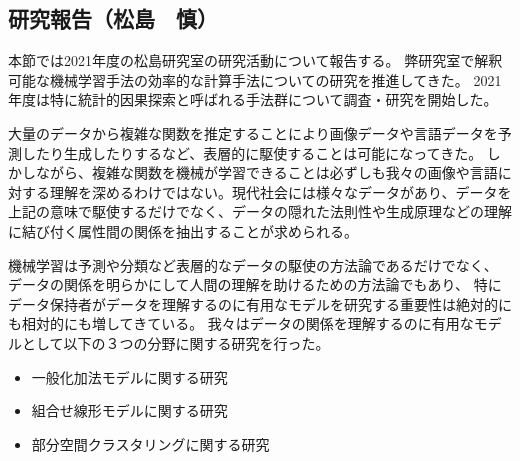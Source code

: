 \subsection{研究報告（松島　慎）}

本節では2021年度の松島研究室の研究活動について報告する。
弊研究室で解釈可能な機械学習手法の効率的な計算手法についての研究を推進してきた。
2021年度は特に統計的因果探索と呼ばれる手法群について調査・研究を開始した。


大量のデータから複雑な関数を推定することにより画像データや言語データを予測したり生成したりするなど、表層的に駆使することは可能になってきた。
しかしながら、複雑な関数を機械が学習できることは必ずしも我々の画像や言語に対する理解を深めるわけではない。現代社会には様々なデータがあり、データを上記の意味で駆使するだけでなく、データの隠れた法則性や生成原理などの理解に結び付く属性間の関係を抽出することが求められる。

機械学習は予測や分類など表層的なデータの駆使の方法論であるだけでなく、
データの関係を明らかにして人間の理解を助けるための方法論でもあり、
特にデータ保持者がデータを理解するのに有用なモデルを研究する重要性は絶対的にも相対的にも増してきている。
我々はデータの関係を理解するのに有用なモデルとして以下の３つの分野に関する研究を行った。
\begin{itemize}
    \item 一般化加法モデルに関する研究
    \item 組合せ線形モデルに関する研究
    \item 部分空間クラスタリングに関する研究
\end{itemize}

